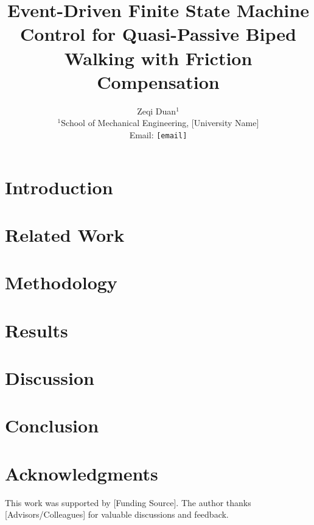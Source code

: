 \documentclass[10pt,twocolumn]{article}
\title{\textbf{Event-Driven Finite State Machine Control for Quasi-Passive Biped Walking with Friction Compensation}}
\author{
    Zeqi Duan$^{1}$ \\
    \small $^{1}$School of Mechanical Engineering, [University Name] \\
    \small Email: \texttt{[email]}
}
\date{}
\begin{document}
\maketitle



\section{Introduction}
\label{sec:introduction}


\section{Related Work}
\label{sec:related_work}


\section{Methodology}
\label{sec:methodology}


\section{Results}
\label{sec:results}


\section{Discussion}
\label{sec:discussion}


\section{Conclusion}
\label{sec:conclusion}


\section*{Acknowledgments}
This work was supported by [Funding Source]. The author thanks [Advisors/Colleagues] for valuable discussions and feedback.



\end{document}
